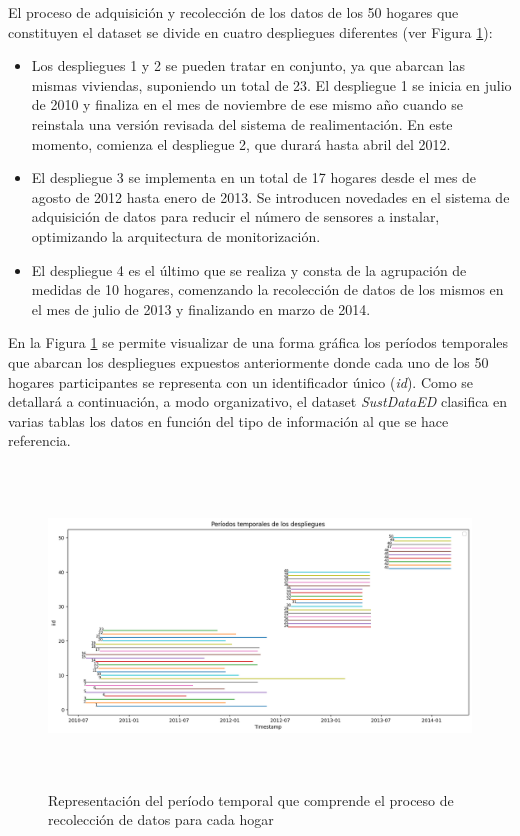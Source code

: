 El proceso de adquisición y recolección de los datos de los 50 hogares que constituyen el dataset se divide en cuatro despliegues diferentes (ver Figura \ref{fig:despliegues}):

\begin{itemize}
    \item Los despliegues 1 y 2 se pueden tratar en conjunto, ya que abarcan las mismas viviendas, suponiendo un total de 23. El despliegue 1 se inicia en julio de 2010 y finaliza en el mes de noviembre de ese mismo año cuando se reinstala una versión revisada del sistema de realimentación. En este momento, comienza el despliegue 2, que durará hasta abril del 2012.
    \item El despliegue 3 se implementa en un total de 17 hogares desde el mes de agosto de 2012 hasta enero de 2013. Se introducen novedades en el sistema de adquisición de datos para reducir el número de sensores a instalar, optimizando la arquitectura de monitorización. 
    \item El despliegue 4 es el último que se realiza y consta de la agrupación de medidas de 10 hogares, comenzando la recolección de datos de los mismos en el mes de julio de 2013 y finalizando en marzo de 2014.
\end{itemize}

En la Figura \ref{fig:despliegues} se permite visualizar de una forma gráfica los períodos temporales que abarcan los despliegues expuestos anteriormente donde cada uno de los 50 hogares participantes se representa con un identificador único (\textit{id}). Como se detallará a continuación, a modo organizativo, el dataset \textit{SustDataED} clasifica en varias tablas los datos en función del tipo de información al que se hace referencia.

\vspace{5mm}

\begin{figure}[h!]
    \centering
    \includegraphics[width=1\textwidth,height=8.5cm]{img/diseno/despliegues.png}
    \caption{Representación del período temporal que comprende el proceso de recolección de datos para cada hogar}
    \label{fig:despliegues}
\end{figure}

